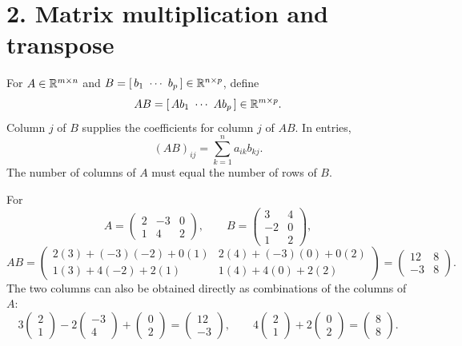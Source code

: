 \section*{2. Matrix multiplication and transpose}

For \(A\in\mathbb R^{m\times n}\) and \(B=[\,b_1\ \cdots\ b_p\,]\in\mathbb R^{n\times p}\),
define
\[
AB=[\,Ab_1\ \cdots\ Ab_p\,]\in\R^{m\times p}.
\]
Column \(j\) of \(B\) supplies the coefficients for column \(j\) of \(AB\).
In entries,
\[
\boxed{(AB)_{ij}=\sum_{k=1}^n a_{ik}b_{kj}.}
\]
The number of columns of \(A\) must equal the number of rows of \(B\).

\begin{example}\label{example:01:product}
For
\[
A=\begin{pmatrix}2&-3&0\\1&4&2\end{pmatrix},\qquad
B=\begin{pmatrix}3&4\\-2&0\\1&2\end{pmatrix},
\]
\[
AB=\begin{pmatrix}
2(3)+(-3)(-2)+0(1)&2(4)+(-3)(0)+0(2)\\
1(3)+4(-2)+2(1)&1(4)+4(0)+2(2)
\end{pmatrix}
=\begin{pmatrix}12&8\\-3&8\end{pmatrix}.
\]
The two columns can also be obtained directly as combinations of the
columns of \(A\):
\[
3\begin{pmatrix}2\\1\end{pmatrix}
-2\begin{pmatrix}-3\\4\end{pmatrix}
+\begin{pmatrix}0\\2\end{pmatrix}
=\begin{pmatrix}12\\-3\end{pmatrix},\qquad
4\begin{pmatrix}2\\1\end{pmatrix}
+2\begin{pmatrix}0\\2\end{pmatrix}
=\begin{pmatrix}8\\8\end{pmatrix}.
\]
\end{example}

